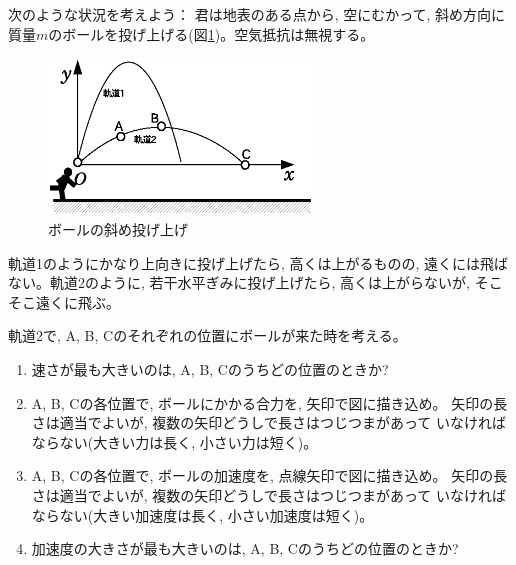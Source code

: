 次のような状況を考えよう： 君は地表のある点から, 空にむかって, 
斜め方向に質量$m$のボールを投げ上げる(図\ref{fig:throwball})。空気抵抗は無視する。

\begin{figure}[h]
    \centering
    \includegraphics[width=7.0cm]{throwball.eps}
    \caption{ボールの斜め投げ上げ}\label{fig:throwball}
\end{figure}

軌道1のようにかなり上向きに投げ上げたら, 高くは上がるものの, 遠くには飛ばない。軌道2のように, 
若干水平ぎみに投げ上げたら, 高くは上がらないが, そこそこ遠くに飛ぶ。

\begin{q}\label{q:2Dthrow0} 軌道2で, A, B, Cのそれぞれの位置にボールが来た時を考える。
\begin{enumerate}
\item 速さが最も大きいのは, A, B, Cのうちどの位置のときか?
\item A, B, Cの各位置で, ボールにかかる合力を, 矢印で図に描き込め。
矢印の長さは適当でよいが, 複数の矢印どうしで長さはつじつまがあって
いなければならない(大きい力は長く, 小さい力は短く)。
\item A, B, Cの各位置で, ボールの加速度を, 点線矢印で図に描き込め。
矢印の長さは適当でよいが, 複数の矢印どうしで長さはつじつまがあって
いなければならない(大きい加速度は長く, 小さい加速度は短く)。
\item 加速度の大きさが最も大きいのは, A, B, Cのうちどの位置のときか?
\end{enumerate}
\end{q}

